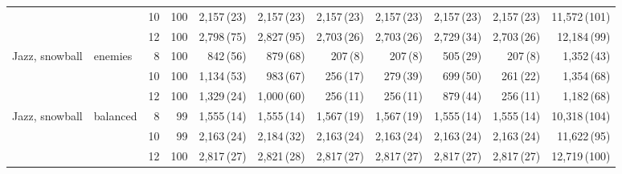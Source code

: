 \begin{table}[p]
{\begin{tabular}{llrrrrrrrrr}
 &  & 10 & 100 & 2,157\,{\scriptsize(23)} & 2,157\,{\scriptsize(23)} & 2,157\,{\scriptsize(23)} & 2,157\,{\scriptsize(23)} & 2,157\,{\scriptsize(23)} & 2,157\,{\scriptsize(23)} & 11,572\,{\scriptsize(101)} \\
 &  & 12 & 100 & 2,798\,{\scriptsize(75)} & 2,827\,{\scriptsize(95)} & 2,703\,{\scriptsize(26)} & 2,703\,{\scriptsize(26)} & 2,729\,{\scriptsize(34)} & 2,703\,{\scriptsize(26)} & 12,184\,{\scriptsize(99)} \\
\addlinespace[1pt]
Jazz, snowball & enemies & 8 & 100 & 842\,{\scriptsize(56)} & 879\,{\scriptsize(68)} & 207\,{\scriptsize(8)} & 207\,{\scriptsize(8)} & 505\,{\scriptsize(29)} & 207\,{\scriptsize(8)} & 1,352\,{\scriptsize(43)} \\
 &  & 10 & 100 & 1,134\,{\scriptsize(53)} & 983\,{\scriptsize(67)} & 256\,{\scriptsize(17)} & 279\,{\scriptsize(39)} & 699\,{\scriptsize(50)} & 261\,{\scriptsize(22)} & 1,354\,{\scriptsize(68)} \\
 &  & 12 & 100 & 1,329\,{\scriptsize(24)} & 1,000\,{\scriptsize(60)} & 256\,{\scriptsize(11)} & 256\,{\scriptsize(11)} & 879\,{\scriptsize(44)} & 256\,{\scriptsize(11)} & 1,182\,{\scriptsize(68)} \\
\addlinespace[1pt]
Jazz, snowball & balanced & 8 & 99 & 1,555\,{\scriptsize(14)} & 1,555\,{\scriptsize(14)} & 1,567\,{\scriptsize(19)} & 1,567\,{\scriptsize(19)} & 1,555\,{\scriptsize(14)} & 1,555\,{\scriptsize(14)} & 10,318\,{\scriptsize(104)} \\
 &  & 10 & 99 & 2,163\,{\scriptsize(24)} & 2,184\,{\scriptsize(32)} & 2,163\,{\scriptsize(24)} & 2,163\,{\scriptsize(24)} & 2,163\,{\scriptsize(24)} & 2,163\,{\scriptsize(24)} & 11,622\,{\scriptsize(95)} \\
 &  & 12 & 100 & 2,817\,{\scriptsize(27)} & 2,821\,{\scriptsize(28)} & 2,817\,{\scriptsize(27)} & 2,817\,{\scriptsize(27)} & 2,817\,{\scriptsize(27)} & 2,817\,{\scriptsize(27)} & 12,719\,{\scriptsize(100)} \\
\bottomrule
\end{tabular}}
\end{table}
